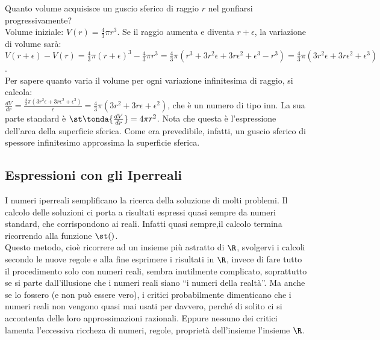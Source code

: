 \begin{esempio}
Quanto volume acquisisce un guscio sferico di raggio $r$ nel gonfiarsi
progressivamente?\\
Volume iniziale: $V(r)=\frac{4}{3}\pi r^3$. Se il raggio aumenta e diventa 
$r+\epsilon$, 
la variazione di volume sarà:\\
\(V(r+\epsilon)-V(r)=\frac{4}{3}\pi (r+\epsilon)^3-\frac{4}{3}\pi r^3=
\frac{4}{3}\pi (r^3+3r^2\epsilon+3r\epsilon^2+\epsilon^3-r^3)=
\frac{4}{3}\pi (3r^2\epsilon+3r\epsilon^2+\epsilon^3)\).\\
Per sapere quanto varia il volume per ogni variazione infinitesima di raggio, 
si calcola:\\
\(\frac{dV}{dr}=\frac{\frac{4}{3}\pi 
(3r^2\epsilon+3r\epsilon^2+\epsilon^3)}{\epsilon}=
\frac{4}{3}\pi (3r^2+3r\epsilon+\epsilon^2)\), che è un numero di tipo inn.
La sua parte standard è $\st\tonda{\frac{dV}{dr}}=4\pi r^2$. Nota che questa
è l'espressione dell'area della superficie sferica. Come era prevedibile, 
infatti, 
un guscio sferico di spessore infinitesimo approssima la superficie sferica.
\end{esempio}

\subsection{Espressioni con gli Iperreali}
\label{subsec:insnum_espressioni}

I numeri iperreali semplificano la ricerca della soluzione di molti problemi.
Il calcolo delle soluzioni ci porta a risultati espressi quasi sempre da 
numeri 
standard, che corrispondono ai reali. Infatti quasi sempre,il calcolo termina
ricorrendo alla funzione $\st()$.\\
Questo metodo, cioè ricorrere ad un insieme più astratto di \(\R\), svolgervi 
i calcoli
secondo le nuove regole e alla fine esprimere i risultati in \(\R\), invece 
di fare
tutto il procedimento solo con numeri reali, sembra inutilmente complicato, 
soprattutto
se si parte dall'illusione che i numeri reali siano ``i numeri della realtà''.
Ma anche se lo fossero (e non può essere vero), i critici probabilmente 
dimenticano 
che i numeri reali non vengono quasi mai usati per davvero, perché di solito 
ci si 
accontenta delle loro approssimazioni razionali. Eppure nessuno dei critici 
lamenta 
l'eccessiva riccheza di numeri, regole, proprietà dell'insieme l'insieme 
\(\R\).


